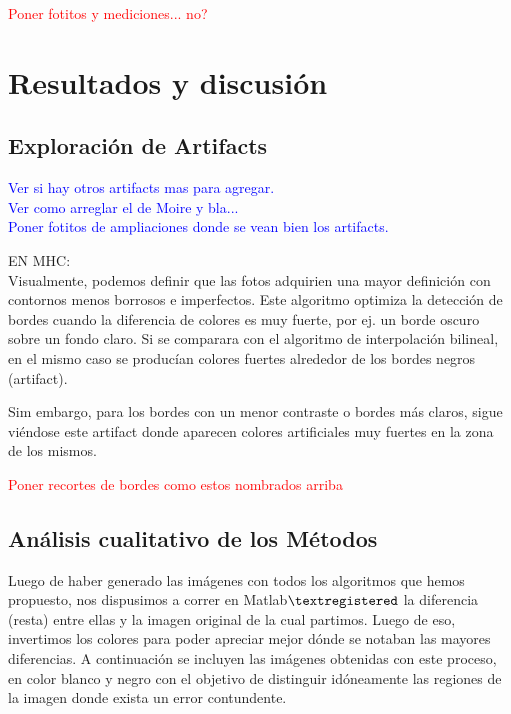 \documentclass[a4paper]{article}
\begin{document}
\textcolor{red}{Poner fotitos y mediciones... no?}\\




\newpage
\section{Resultados y discusi\'on}
\subsection{Exploraci\'on de Artifacts}

\textcolor{blue}{Ver si hay otros artifacts mas para agregar.\\
Ver como arreglar el de Moire y bla...\\
Poner fotitos de ampliaciones donde se vean bien los artifacts.}

EN MHC:\\

Visualmente, podemos definir que las fotos adquirien una mayor definici\'on con contornos menos borrosos e imperfectos. Este algoritmo optimiza la detecci\'on de bordes cuando la diferencia de colores es muy fuerte, por ej. un borde oscuro sobre un fondo claro. Si se comparara con el algoritmo de interpolaci\'on bilineal, en el mismo caso se produc\'ian colores fuertes alrededor de los bordes negros (artifact).

Sim embargo, para los bordes con un menor contraste o bordes m\'as claros, sigue vi\'endose este artifact donde aparecen colores artificiales muy fuertes en la zona de los mismos.

\textcolor{red}{Poner recortes de bordes como estos nombrados arriba}


\newpage
\subsection{An\'alisis cualitativo de los M\'etodos}
Luego de haber generado las im\'agenes con todos los algoritmos que hemos propuesto, nos dispusimos a correr en Matlab$\textregistered$  la diferencia (resta) entre ellas y la imagen original de la cual partimos. Luego de eso, invertimos los colores para poder apreciar mejor d\'onde se notaban las mayores diferencias. A continuaci\'on se incluyen las im\'agenes obtenidas con este proceso, en color blanco y negro con el objetivo de distinguir id\'oneamente las regiones de la imagen donde exista un error contundente.\\
\end{document}
